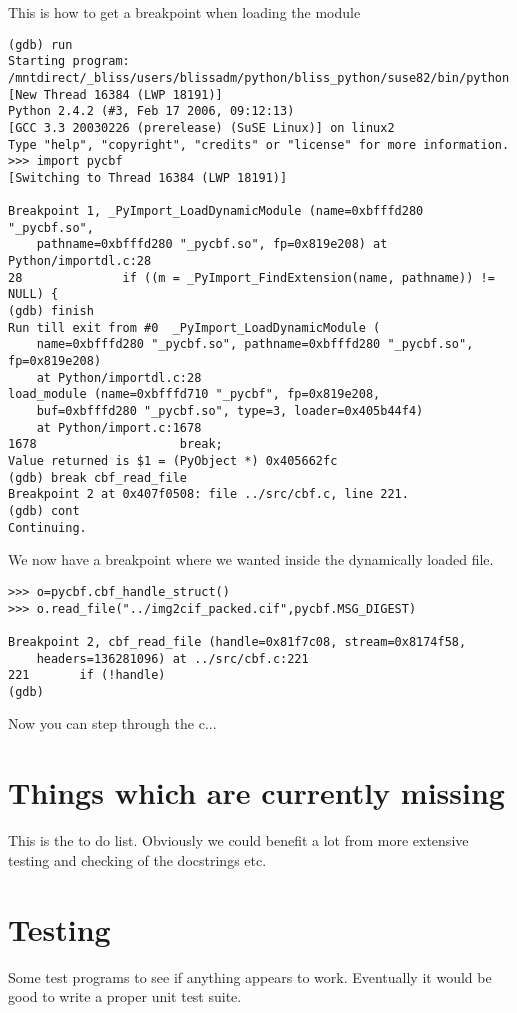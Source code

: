 \documentclass[10pt,a4paper,twoside,notitlepage]{article}
\begin{document}
This is how to get a breakpoint when loading the module
\begin{verbatim}
(gdb) run
Starting program: /mntdirect/_bliss/users/blissadm/python/bliss_python/suse82/bin/python
[New Thread 16384 (LWP 18191)]
Python 2.4.2 (#3, Feb 17 2006, 09:12:13)
[GCC 3.3 20030226 (prerelease) (SuSE Linux)] on linux2
Type "help", "copyright", "credits" or "license" for more information.
>>> import pycbf
[Switching to Thread 16384 (LWP 18191)]

Breakpoint 1, _PyImport_LoadDynamicModule (name=0xbfffd280 "_pycbf.so",
    pathname=0xbfffd280 "_pycbf.so", fp=0x819e208) at Python/importdl.c:28
28              if ((m = _PyImport_FindExtension(name, pathname)) != NULL) {
(gdb) finish
Run till exit from #0  _PyImport_LoadDynamicModule (
    name=0xbfffd280 "_pycbf.so", pathname=0xbfffd280 "_pycbf.so", fp=0x819e208)
    at Python/importdl.c:28
load_module (name=0xbfffd710 "_pycbf", fp=0x819e208,
    buf=0xbfffd280 "_pycbf.so", type=3, loader=0x405b44f4)
    at Python/import.c:1678
1678                    break;
Value returned is $1 = (PyObject *) 0x405662fc
(gdb) break cbf_read_file
Breakpoint 2 at 0x407f0508: file ../src/cbf.c, line 221.
(gdb) cont
Continuing.
\end{verbatim}

We now have a breakpoint where we wanted inside the dynamically loaded file. 
\begin{verbatim}
>>> o=pycbf.cbf_handle_struct()
>>> o.read_file("../img2cif_packed.cif",pycbf.MSG_DIGEST)

Breakpoint 2, cbf_read_file (handle=0x81f7c08, stream=0x8174f58,
    headers=136281096) at ../src/cbf.c:221
221       if (!handle)
(gdb)
\end{verbatim}

Now you can step through the c...

\section{Things which are currently missing}

This is the to do list. Obviously we could benefit a lot from more
extensive testing and checking of the docstrings etc.



\section{Testing}

Some test programs to see if anything appears to work. Eventually
it would be good to write a proper unit test suite.
\end{document}
